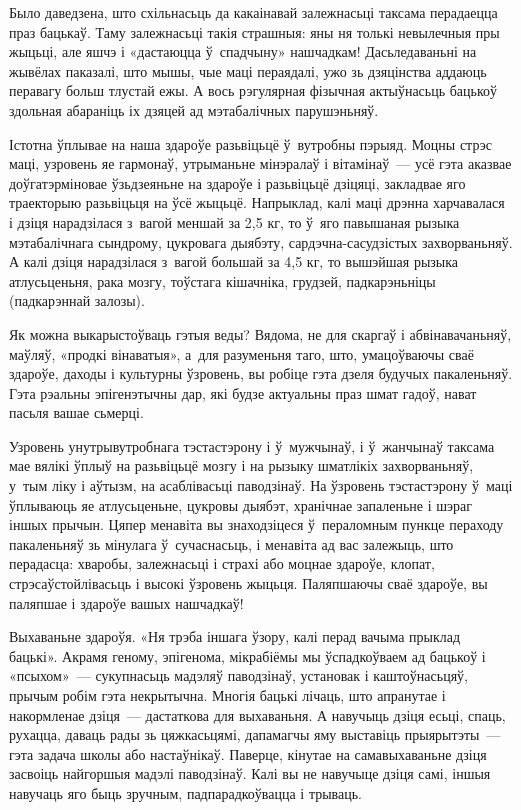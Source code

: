 Было даведзена, што схільнасьць да какаінавай залежнасьці таксама перадаецца праз бацькаў. Таму залежнасьці такія страшныя: яны ня толькі невылечныя пры жыцьці, але яшчэ і «дастаюцца ў~спадчыну» нашчадкам! Дасьледаваньні на жывёлах паказалі, што мышы, чые маці пераядалі, ужо зь дзяцінства аддаюць перавагу больш тлустай ежы. А вось рэгулярная фізычная актыўнасьць бацькоў здольная абараніць іх дзяцей ад мэтабалічных парушэньняў.

Істотна ўплывае на наша здароўе разьвіцьцё ў~вутробны пэрыяд. Моцны стрэс маці, узровень яе гармонаў, утрыманьне мінэралаў і вітамінаў~--- усё гэта аказвае доўгатэрміновае ўзьдзеяньне на здароўе і разьвіцьцё дзіцяці, закладвае яго траекторыю разьвіцьця на ўсё жыцьцё. Напрыклад, калі маці дрэнна харчавалася і дзіця нарадзілася з~вагой меншай за 2,5 кг, то ў~яго павышаная рызыка мэтабалічнага сындрому, цукровага дыябэту, сардэчна-сасудзістых захворваньняў. А калі дзіця нарадзілася з~вагой большай за 4,5 кг, то вышэйшая рызыка атлусьценьня, рака мозгу, тоўстага кішачніка, грудзей, падкарэньніцы (падкарэннай залозы).

Як можна выкарыстоўваць гэтыя веды? Вядома, не для скаргаў і абвінавачаньняў, маўляў, «продкі вінаватыя», а~для разуменьня таго, што, умацоўваючы сваё здароўе, даходы і культурны ўзровень, вы робіце гэта дзеля будучых пакаленьняў. Гэта рэальны эпігенэтычны дар, які будзе актуальны праз шмат гадоў, нават пасьля вашае сьмерці.

Узровень унутрывутробнага тэстастэрону і ў~мужчынаў, і ў~жанчынаў таксама мае вялікі ўплыў на разьвіцьцё мозгу і на рызыку шматлікіх захворваньняў, у~тым ліку і аўтызм, на асаблівасьці паводзінаў. На ўзровень тэстастэрону ў~маці ўплываюць яе атлусьценьне, цукровы дыябэт, хранічнае запаленьне і шэраг іншых прычын. Цяпер менавіта вы знаходзіцеся ў~пераломным пункце пераходу пакаленьняў зь мінулага ў~сучаснасьць, і менавіта ад вас залежыць, што перадасца: хваробы, залежнасьці і страхі або моцнае здароўе, клопат, стрэсаўстойлівасьць і высокі ўзровень жыцьця. Паляпшаючы сваё здароўе, вы паляпшае і здароўе вашых нашчадкаў!

Выхаваньне здароўя. «Ня трэба іншага ўзору, калі перад вачыма прыклад бацькі». Акрамя геному, эпігенома, мікрабіёмы мы ўспадкоўваем ад бацькоў і «псыхом»~--- сукупнасьць мадэляў паводзінаў, установак і каштоўнасьцяў, прычым робім гэта некрытычна. Многія бацькі лічаць, што апранутае і накормленае дзіця~--- дастаткова для выхаваньня. А навучыць дзіця есьці, спаць, рухацца, даваць рады зь цяжкасьцямі, дапамагчы яму выставіць прыярытэты~--- гэта задача школы або настаўнікаў. Паверце, кінутае на самавыхаваньне дзіця засвоіць найгоршыя мадэлі паводзінаў. Калі вы не навучыце дзіця самі, іншыя навучаць яго быць зручным, падпарадкоўвацца і трываць.

